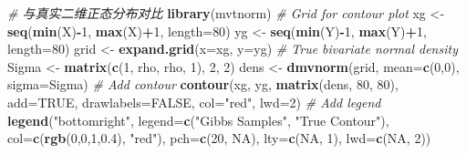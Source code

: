 \documentclass[
]{book}
\newenvironment{Shaded}{\begin{snugshade}}{\end{snugshade}}
\newcommand{\AttributeTok}[1]{\textcolor[rgb]{0.13,0.29,0.53}{#1}}
\newcommand{\CommentTok}[1]{\textcolor[rgb]{0.56,0.35,0.01}{\textit{#1}}}
\newcommand{\ConstantTok}[1]{\textcolor[rgb]{0.56,0.35,0.01}{#1}}
\newcommand{\DecValTok}[1]{\textcolor[rgb]{0.00,0.00,0.81}{#1}}
\newcommand{\FloatTok}[1]{\textcolor[rgb]{0.00,0.00,0.81}{#1}}
\newcommand{\FunctionTok}[1]{\textcolor[rgb]{0.13,0.29,0.53}{\textbf{#1}}}
\newcommand{\NormalTok}[1]{#1}
\newcommand{\OtherTok}[1]{\textcolor[rgb]{0.56,0.35,0.01}{#1}}
\newcommand{\SpecialCharTok}[1]{\textcolor[rgb]{0.81,0.36,0.00}{\textbf{#1}}}
\newcommand{\StringTok}[1]{\textcolor[rgb]{0.31,0.60,0.02}{#1}}
\begin{document}
\begin{Shaded}
\begin{Highlighting}[]
\CommentTok{\# 与真实二维正态分布对比}
\FunctionTok{library}\NormalTok{(mvtnorm)}
\CommentTok{\# Grid for contour plot}
\NormalTok{xg }\OtherTok{\textless{}{-}} \FunctionTok{seq}\NormalTok{(}\FunctionTok{min}\NormalTok{(X)}\SpecialCharTok{{-}}\DecValTok{1}\NormalTok{, }\FunctionTok{max}\NormalTok{(X)}\SpecialCharTok{+}\DecValTok{1}\NormalTok{, }\AttributeTok{length=}\DecValTok{80}\NormalTok{)}
\NormalTok{yg }\OtherTok{\textless{}{-}} \FunctionTok{seq}\NormalTok{(}\FunctionTok{min}\NormalTok{(Y)}\SpecialCharTok{{-}}\DecValTok{1}\NormalTok{, }\FunctionTok{max}\NormalTok{(Y)}\SpecialCharTok{+}\DecValTok{1}\NormalTok{, }\AttributeTok{length=}\DecValTok{80}\NormalTok{)}
\NormalTok{grid }\OtherTok{\textless{}{-}} \FunctionTok{expand.grid}\NormalTok{(}\AttributeTok{x=}\NormalTok{xg, }\AttributeTok{y=}\NormalTok{yg)}
\CommentTok{\# True bivariate normal density}
\NormalTok{Sigma }\OtherTok{\textless{}{-}} \FunctionTok{matrix}\NormalTok{(}\FunctionTok{c}\NormalTok{(}\DecValTok{1}\NormalTok{, rho, rho, }\DecValTok{1}\NormalTok{), }\DecValTok{2}\NormalTok{, }\DecValTok{2}\NormalTok{)}
\NormalTok{dens }\OtherTok{\textless{}{-}} \FunctionTok{dmvnorm}\NormalTok{(grid, }\AttributeTok{mean=}\FunctionTok{c}\NormalTok{(}\DecValTok{0}\NormalTok{,}\DecValTok{0}\NormalTok{), }\AttributeTok{sigma=}\NormalTok{Sigma)}
\CommentTok{\# Add contour}
\FunctionTok{contour}\NormalTok{(xg, yg, }\FunctionTok{matrix}\NormalTok{(dens, }\DecValTok{80}\NormalTok{, }\DecValTok{80}\NormalTok{),}
        \AttributeTok{add=}\ConstantTok{TRUE}\NormalTok{, }\AttributeTok{drawlabels=}\ConstantTok{FALSE}\NormalTok{,}
        \AttributeTok{col=}\StringTok{"red"}\NormalTok{, }\AttributeTok{lwd=}\DecValTok{2}\NormalTok{)}
\CommentTok{\# Add legend}
\FunctionTok{legend}\NormalTok{(}\StringTok{"bottomright"}\NormalTok{,}
       \AttributeTok{legend=}\FunctionTok{c}\NormalTok{(}\StringTok{"Gibbs Samples"}\NormalTok{, }\StringTok{"True Contour"}\NormalTok{),}
       \AttributeTok{col=}\FunctionTok{c}\NormalTok{(}\FunctionTok{rgb}\NormalTok{(}\DecValTok{0}\NormalTok{,}\DecValTok{0}\NormalTok{,}\DecValTok{1}\NormalTok{,}\FloatTok{0.4}\NormalTok{), }\StringTok{"red"}\NormalTok{),}
       \AttributeTok{pch=}\FunctionTok{c}\NormalTok{(}\DecValTok{20}\NormalTok{, }\ConstantTok{NA}\NormalTok{),}
       \AttributeTok{lty=}\FunctionTok{c}\NormalTok{(}\ConstantTok{NA}\NormalTok{, }\DecValTok{1}\NormalTok{),}
       \AttributeTok{lwd=}\FunctionTok{c}\NormalTok{(}\ConstantTok{NA}\NormalTok{, }\DecValTok{2}\NormalTok{))}
\end{Highlighting}
\end{Shaded}
\end{document}
